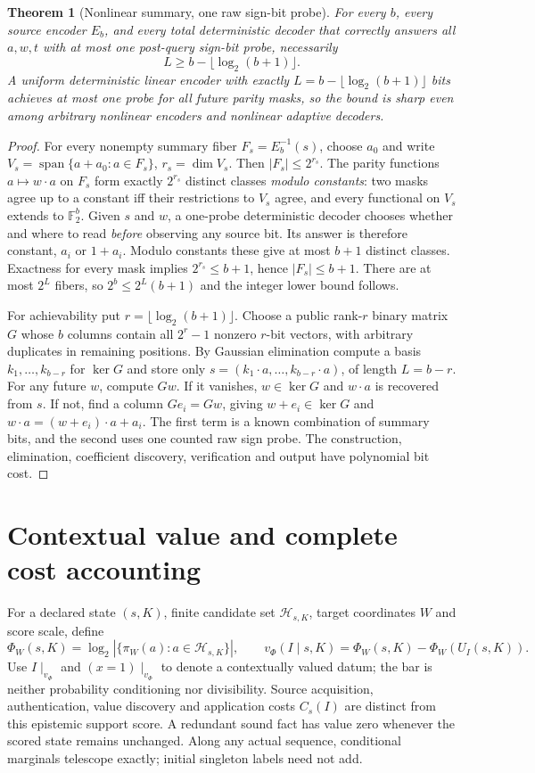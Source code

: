 \documentclass[10pt]{article}
\newtheorem{theorem}{Theorem}
\begin{document}
\begin{theorem}[Nonlinear summary, one raw sign-bit probe]\label{th:one}
For every $b$, every source encoder $E_b$, and every total deterministic
decoder that correctly answers all $a,w,t$ with at most \emph{one}
post-query sign-bit probe, necessarily
\[
 \boxed{L\ge b-\lfloor\log_2(b+1)\rfloor}.
\]
A uniform deterministic linear encoder with exactly
$L=b-\lfloor\log_2(b+1)\rfloor$ bits achieves at most one probe
for all future parity masks, so the bound is sharp even among arbitrary
nonlinear encoders and nonlinear adaptive decoders.
\end{theorem}
\begin{proof}
For every nonempty summary fiber $F_s=E_b^{-1}(s)$, choose $a_0$ and
write $V_s=\operatorname{span}\{a+a_0:a\in F_s\}$, $r_s=\dim V_s$.
Then $|F_s|\le2^{r_s}$.
The parity functions $a\mapsto w\cdot a$ on $F_s$ form exactly
$2^{r_s}$ distinct classes \emph{modulo constants}: two masks agree up
to a constant iff their restrictions to $V_s$ agree, and every
functional on $V_s$ extends to $\mathbb F_2^b$.
Given $s$ and $w$, a one-probe deterministic decoder chooses whether
and where to read \emph{before} observing any source bit.
Its answer is therefore constant, $a_i$ or $1+a_i$.
Modulo constants these give at most $b+1$ distinct classes.
Exactness for every mask implies $2^{r_s}\le b+1$,
hence $|F_s|\le b+1$.
There are at most $2^L$ fibers, so
$2^b\le2^L(b+1)$ and the integer lower bound follows.

For achievability put $r=\lfloor\log_2(b+1)\rfloor$.
Choose a public rank-$r$ binary matrix $G$ whose $b$ columns contain
all $2^r-1$ nonzero $r$-bit vectors, with arbitrary duplicates in
remaining positions. By Gaussian elimination compute a basis
$k_1,\ldots,k_{b-r}$ for $\ker G$ and store only
$s=(k_1\cdot a,\ldots,k_{b-r}\cdot a)$, of length $L=b-r$.
For any future $w$, compute $Gw$. If it vanishes,
$w\in\ker G$ and $w\cdot a$ is recovered from $s$.
If not, find a column $Ge_i=Gw$, giving
$w+e_i\in\ker G$ and $w\cdot a=(w+e_i)\cdot a+a_i$.
The first term is a known combination of summary bits, and the
second uses one counted raw sign probe. The construction, elimination,
coefficient discovery, verification and output have polynomial bit cost.
\end{proof}

\section{Contextual value and complete cost accounting}
For a declared state $(s,K)$, finite candidate set $\mathcal H_{s,K}$,
target coordinates $W$ and score scale, define
\[
\Phi_W(s,K)=\log_2|\{\pi_W(a):a\in\mathcal H_{s,K}\}|,\qquad
v_\Phi(I\mid s,K)=\Phi_W(s,K)-\Phi_W(U_I(s,K)).
\]
Use $I\mid_{v_\Phi}$ and $(x=1)\mid_{v_\Phi}$ to denote a
contextually valued datum; the bar is neither probability conditioning
nor divisibility. Source acquisition, authentication, value discovery
and application costs $C_s(I)$ are distinct from this epistemic
support score. A redundant sound fact has value zero whenever the
scored state remains unchanged. Along any actual sequence, conditional
marginals telescope exactly; initial singleton labels need not add.
\end{document}
